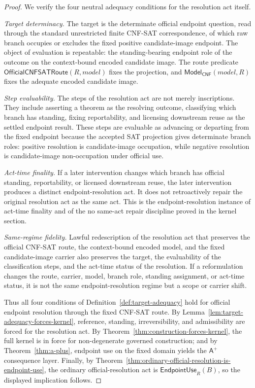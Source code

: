 \documentclass[11pt]{article}
\theoremstyle{definition}
\theoremstyle{remark}
\newcommand{\Aplus}{\mathsf{A}^{+}}
\newcommand{\EndpointUse}{\mathsf{EndpointUse}}
\newcommand{\ModelOfCnf}{\mathsf{Model}_{\mathsf{CNF}}}
\newcommand{\OfficialCNFSATRoute}{\mathsf{OfficialCNFSATRoute}}
\begin{document}
\begin{proof}
We verify the four neutral adequacy conditions for the resolution act itself.

\emph{Target determinacy.} The target is the determinate official endpoint question, read through the standard unrestricted finite CNF-SAT correspondence, of which raw branch occupies or excludes the fixed positive candidate-image endpoint. The object of evaluation is repeatable: the standing-bearing endpoint role of the outcome on the context-bound encoded candidate image. The route predicate \(\OfficialCNFSATRoute(R,model)\) fixes the projection, and \(\ModelOfCnf(model,R)\) fixes the adequate encoded candidate image.

\emph{Step evaluability.} The steps of the resolution act are not merely inscriptions. They include asserting a theorem as the resolving outcome, classifying which branch has standing, fixing reportability, and licensing downstream reuse as the settled endpoint result. These steps are evaluable as advancing or departing from the fixed endpoint because the accepted SAT projection gives determinate branch roles: positive resolution is candidate-image occupation, while negative resolution is candidate-image non-occupation under official use.

\emph{Act-time finality.} If a later intervention changes which branch has official standing, reportability, or licensed downstream reuse, the later intervention produces a distinct endpoint-resolution act. It does not retroactively repair the original resolution act as the same act. This is the endpoint-resolution instance of act-time finality and of the no same-act repair discipline proved in the kernel section.

\emph{Same-regime fidelity.} Lawful redescription of the resolution act that preserves the official CNF-SAT route, the context-bound encoded model, and the fixed candidate-image carrier also preserves the target, the evaluability of the classification steps, and the act-time status of the resolution. If a reformulation changes the route, carrier, model, branch role, standing assignment, or act-time status, it is not the same endpoint-resolution regime but a scope or carrier shift.

Thus all four conditions of Definition~\ref{def:target-adequacy} hold for official endpoint resolution through the fixed CNF-SAT route. By Lemma~\ref{lem:target-adequacy-forces-kernel}, reference, standing, irreversibility, and admissibility are forced for the resolution act. By Theorem~\ref{thm:construction-forces-kernel}, the full kernel is in force for non-degenerate governed construction; and by Theorem~\ref{thm:a-plus}, endpoint use on the fixed domain yields the \(\Aplus\) consequence layer. Finally, by Theorem~\ref{thm:ordinary-official-resolution-is-endpoint-use}, the ordinary official-resolution act is \(\EndpointUse_R(B)\), so the displayed implication follows.


\end{proof}
\end{document}
